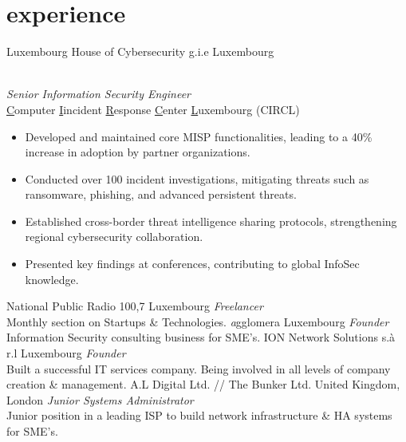 \documentclass[]{friggeri-cv} %
\begin{document}
\section{experience}
\begin{entrylist}
{Luxembourg House of Cybersecurity g.i.e}
{Luxembourg}
{\\
\emph{Senior Information Security Engineer} \\
\underline{C}omputer \underline{I}incident \underline{R}esponse \underline{C}enter \underline{L}uxembourg (CIRCL)
\begin{itemize}
    \item Developed and maintained core MISP functionalities, leading to a 40\% increase in adoption by partner organizations.
    \item Conducted over 100 incident investigations, mitigating threats such as ransomware, phishing, and advanced persistent threats.
    \item Established cross-border threat intelligence sharing protocols, strengthening regional cybersecurity collaboration.
    \item Presented key findings at conferences, contributing to global InfoSec knowledge.
\end{itemize}	
}
{National Public Radio 100,7}
{Luxembourg}
{\emph{Freelancer}\\
Monthly section on Startups \& Technologies.}
{\emph{a}gglomera}
{Luxembourg}
{\emph{Founder}\\
Information Security consulting business for SME's.}
{ION Network Solutions s.\`{a} r.l}
{Luxembourg}
{\emph{Founder} \\
Built a successful IT services company. Being involved in all levels of company creation \& management.}
{A.L Digital Ltd. // The Bunker Ltd.}
{United Kingdom, London}
{\emph{Junior Systems Administrator} \\
Junior position in a leading ISP to build network infrastructure \& HA systems for SME's.}
\end{entrylist}

\newpage
\end{document}
